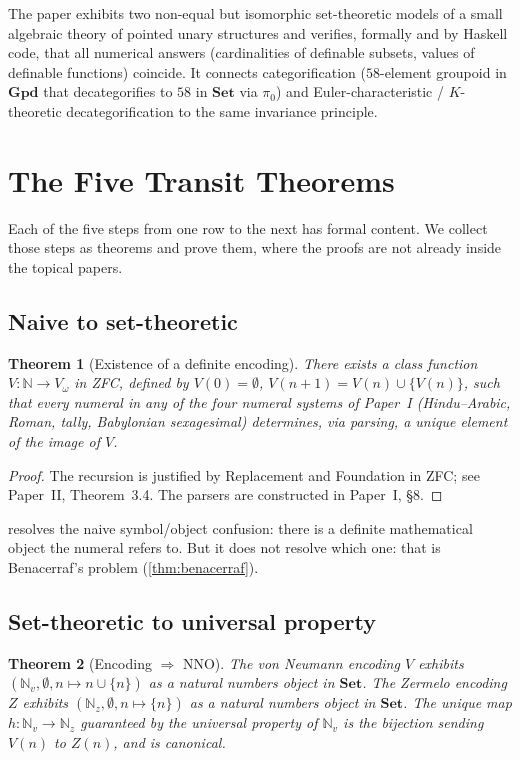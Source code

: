 \documentclass[12pt]{article}
\newtheorem{theorem}{Theorem}[section]
\theoremstyle{definition}
\theoremstyle{remark}
\newcommand{\N}{\mathbb{N}}
\newcommand{\Set}{\mathbf{Set}}
\newcommand{\Grpd}{\mathbf{Gpd}}
\begin{document}
The paper exhibits two non-equal but isomorphic set-theoretic models of a
small algebraic theory of pointed unary structures and verifies, formally
and by Haskell code, that all numerical answers (cardinalities of
definable subsets, values of definable functions) coincide. It connects
categorification ($58$-element groupoid in $\Grpd$ that decategorifies to
$58$ in $\Set$ via $\pi_0$) and Euler-characteristic / $K$-theoretic
decategorification to the same invariance principle.

\section{The Five Transit Theorems}
\label{sec:transit}

Each of the five steps from one row to the next has formal content. We
collect those steps as theorems and prove them, where the proofs are not
already inside the topical papers.

\subsection{Naive to set-theoretic}
\label{sec:transit-i}

\begin{theorem}[Existence of a definite encoding]
\label{thm:transit-i}
There exists a class function $V : \N \to V_\omega$ in ZFC, defined by
$V(0) = \emptyset$, $V(n+1) = V(n) \cup \{V(n)\}$, such that every numeral
in any of the four numeral systems of Paper~I (Hindu--Arabic, Roman, tally,
Babylonian sexagesimal) determines, via parsing, a unique element of the
image of $V$.
\end{theorem}

\begin{proof}
The recursion is justified by Replacement and Foundation in ZFC; see
Paper~II, Theorem~3.4. The parsers are constructed in Paper~I, \S8.
\end{proof}

 resolves the naive symbol/object confusion: there is
a definite mathematical object the numeral refers to. But it does not
resolve which one: that is Benacerraf's problem (\cref{thm:benacerraf}).

\subsection{Set-theoretic to universal property}
\label{sec:transit-ii}

\begin{theorem}[Encoding $\Rightarrow$ NNO]
\label{thm:transit-ii}
The von Neumann encoding $V$ exhibits $(\N_v, \emptyset, n \mapsto n \cup \{n\})$
as a natural numbers object in $\Set$. The Zermelo encoding $Z$ exhibits
$(\N_z, \emptyset, n \mapsto \{n\})$ as a natural numbers object in $\Set$.
The unique map $h\colon \N_v \to \N_z$ guaranteed by the universal property
of $\N_v$ is the bijection sending $V(n)$ to $Z(n)$, and is canonical.
\end{theorem}
\end{document}
